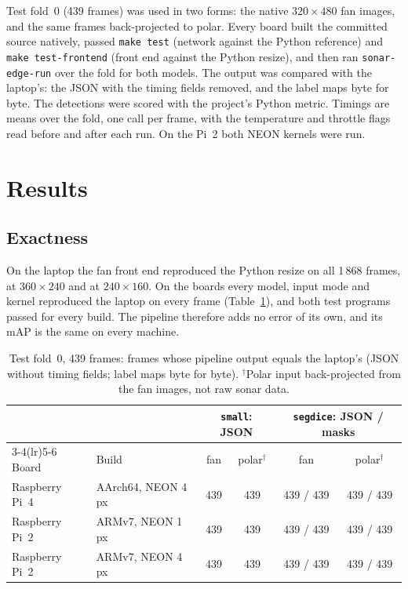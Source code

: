 \documentclass[11pt,a4paper]{article}
\newcommand{\cfg}[1]{\texttt{#1}}
\begin{document}
Test fold~0 (439 frames) was used in two forms: the native
$320 \times 480$ fan images, and the same frames back-projected to polar.
Every board built the committed source natively, passed \texttt{make
test} (network against the Python reference) and \texttt{make
test-frontend} (front end against the Python resize), and then ran
\texttt{sonar-edge-run} over the fold for both models. The output was
compared with the laptop's: the JSON with the timing fields removed, and
the label maps byte for byte. The detections were scored with the
project's Python metric. Timings are means over the fold, one call per
frame, with the temperature and throttle flags read before and after
each run. On the Pi~2 both NEON kernels were run.

\section{Results}
\label{sec:results}

\subsection{Exactness}

On the laptop the fan front end reproduced the Python resize on all
1\,868 frames, at $360 \times 240$ and at $240 \times 160$. On the boards
every model, input mode and kernel reproduced the laptop on every frame
(Table~\ref{tab:e2eid}), and both test programs passed for every build.
The pipeline therefore adds no error of its own, and its mAP is the same
on every machine.

\begin{table}[H]
\centering
\caption{Test fold~0, 439 frames: frames whose pipeline output equals the
laptop's (JSON without timing fields; label maps byte for byte).
$^\dagger$Polar input back-projected from the fan images, not raw sonar
data.}
\label{tab:e2eid}
\begin{tabular}{llcccc}
\toprule
 & & \multicolumn{2}{c}{\cfg{small}: JSON} & \multicolumn{2}{c}{\cfg{segdice}: JSON / masks} \\
\cmidrule(lr){3-4}\cmidrule(lr){5-6}
Board & Build & fan & polar$^\dagger$ & fan & polar$^\dagger$ \\
\midrule
Raspberry Pi~4 & AArch64, NEON 4 px & 439 & 439 & 439 / 439 & 439 / 439 \\
Raspberry Pi~2 & ARMv7, NEON 1 px & 439 & 439 & 439 / 439 & 439 / 439 \\
Raspberry Pi~2 & ARMv7, NEON 4 px & 439 & 439 & 439 / 439 & 439 / 439 \\
\bottomrule
\end{tabular}
\end{table}
\end{document}
